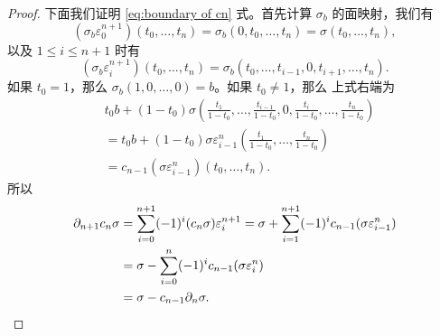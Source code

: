 \documentclass[fontset=none]{Notes}
\begin{document}
\begin{proof}
  下面我们证明 \eqref{eq:boundary of cn} 式。首先计算
  $\sigma_b$ 的面映射，我们有
  \[
    (\sigma_b\varepsilon_0^{n+1})(t_0,\dots,t_{n})
    =\sigma_b(0,t_0,\dots,t_n)=\sigma(t_0,\dots,t_n),
  \]
  以及 $1\leq i\leq n+1$ 时有
  \[
    (\sigma_b\varepsilon_i^{n+1})(t_0,\dots,t_n)=
    \sigma_b(t_0,\dots,t_{i-1},0,t_{i+1},\dots,t_n).
  \]
  如果 $t_0=1$，那么 $\sigma_b(1,0,\dots,0)=b$。如果 $t_0\neq 1$，那么
  上式右端为
  \begin{align*}
    &t_0b+(1-t_0)\sigma\left(\frac{t_1}{1-t_0},\dots,\frac{t_{i-1}}{1-t_0},0,\frac{t_i}{1-t_0},\dots,\frac{t_n}{1-t_0}\right)\\
    &=t_0b+(1-t_0)\sigma\varepsilon_{i-1}^n\left(\frac{t_1}{1-t_0},\dots,\frac{t_n}{1-t_0}\right)\\
    &=c_{n-1}(\sigma\varepsilon_{i-1}^n)(t_0,\dots,t_n).
  \end{align*}
  所以
  \begin{align*}
    \partial_{n+1}c_n\sigma&=\sum_{i=0}^{n+1}(-1)^i (c_n\sigma)\varepsilon_i^{n+1}
    =\sigma+\sum_{i=1}^{n+1}(-1)^ic_{n-1}(\sigma\varepsilon_{i-1}^n)\\
    &=\sigma-\sum_{i=0}^n(-1)^ic_{n-1}(\sigma\varepsilon_i^n)\\
    &=\sigma-c_{n-1}\partial_n\sigma.\qedhere
  \end{align*}
\end{proof}
\end{document}

